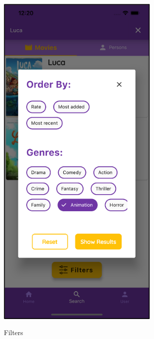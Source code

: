 \documentclass[12pt, a4paper]{article}
\numberwithin{figure}{section}
\begin{document}
\begin{center}
\begin{minipage}[t]{0.31\textwidth}
\begin{figure}[H]
			\includegraphics[width=0.71\textwidth]{images/final/filters.png}\\
			\caption{Filters}
		\end{figure}
	\end{minipage}
	\hspace{0.015\linewidth}
	\begin{minipage}[t]{0.31\textwidth}
		\begin{figure}[H]
			\centering

\end{figure}
\end{minipage}
\end{center}
\end{document}
